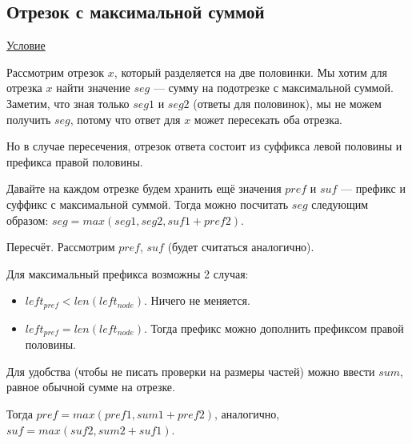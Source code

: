 \pagebreak

\subsection{Отрезок с максимальной суммой} \href{https://codeforces.com/edu/course/2/lesson/4/2/practice/contest/273278/problem/A}{Условие}

Рассмотрим отрезок $x$, который разделяется на две половинки. Мы хотим для отрезка $x$ найти значение $seg$ — сумму на подотрезке с максимальной суммой. Заметим, что зная только $seg1$ и $seg2$ (ответы для половинок), мы не можем получить $seg$, потому что ответ для $x$ может пересекать оба отрезка.
\down

Но в случае пересечения, отрезок ответа состоит из суффикса левой половины и префикса правой половины. 
\down

Давайте на каждом отрезке будем хранить ещё значения $pref$ и $suf$ --- префикс и суффикс с максимальной суммой. Тогда можно посчитать $seg$ следующим образом: $seg=max(seg1,seg2,suf1+pref2)$.

\begin{center}
	\begin{figure}[h]
	\end{figure}
\end{center}

Пересчёт. Рассмотрим $pref$, $suf$ (будет считаться аналогично).

Для максимальный префикса возможны 2 случая:

\up \up
\begin{itemize}
	\item $left_{pref} < len(left_{node})$. Ничего не меняется.
	\item $left_{pref} = len(left_{node})$. Тогда префикс можно дополнить префиксом правой половины.
\end{itemize}
\up \up

Для удобства (чтобы не писать проверки на размеры частей) можно ввести $sum$, равное обычной сумме на отрезке.

Тогда $pref=max(pref1,sum1+pref2)$, аналогично, $suf=max(suf2,sum2+suf1)$.

